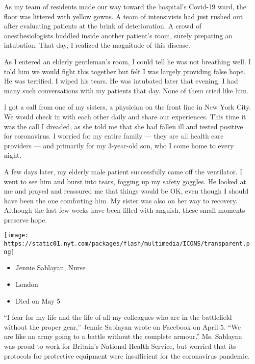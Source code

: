 As my team of residents made our way toward the hospital's Covid-19
ward, the floor was littered with yellow gowns. A team of intensivists
had just rushed out after evaluating patients at the brink of
deterioration. A crowd of anesthesiologists huddled inside another
patient's room, surely preparing an intubation. That day, I realized the
magnitude of this disease.

As I entered an elderly gentleman's room, I could tell he was not
breathing well. I told him we would fight this together but felt I was
largely providing false hope. He was terrified. I wiped his tears. He
was intubated later that evening. I had many such conversations with my
patients that day. None of them cried like him.

I got a call from one of my sisters, a physician on the front line in
New York City. We would check in with each other daily and share our
experiences. This time it was the call I dreaded, as she told me that
she had fallen ill and tested positive for coronavirus. I worried for my
entire family --- they are all health care providers --- and primarily
for my 3-year-old son, who I come home to every night.

A few days later, my elderly male patient successfully came off the
ventilator. I went to see him and burst into tears, fogging up my safety
goggles. He looked at me and prayed and reassured me that things would
be OK, even though I should have been the one comforting him. My sister
was also on her way to recovery. Although the last few weeks have been
filled with anguish, these small moments preserve hope.

\texttt{[image: https://static01.nyt.com/packages/flash/multimedia/ICONS/transparent.png]}

\begin{itemize}
\tightlist
\item
  Jennie Sablayan, Nurse
\item
  London
\item
  Died on May 5
\end{itemize}

``I fear for my life and the life of all my colleagues who are in the
battlefield without the proper gear,'' Jennie Sablayan wrote on Facebook
on April 5. ``We are like an army going to a battle without the complete
armour.'' Ms. Sablayan was proud to work for Britain's National Health
Service, but worried that its protocols for protective equipment were
insufficient for the coronavirus pandemic.

